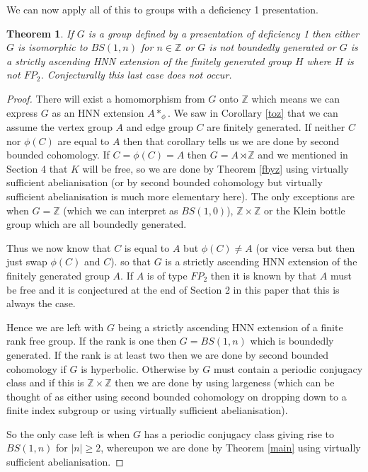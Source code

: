 \documentclass[11pt,reqno]{amsart}
\numberwithin{equation}{section}
\newcommand{\Z}{\mathbb{Z}}
\newcommand{\geqs}{\geqslant}
\newtheorem{thm}{Theorem}[section]
\theoremstyle{definition}
\theoremstyle{remark}
\begin{document}
We can now apply all of this to groups with a deficiency 1 presentation.
\begin{thm} \label{nbgd1}
  If $G$ is a group defined by a presentation of deficiency 1 then either
  $G$ is isomorphic to $BS(1,n)$ for $n\in\Z$ or
  $G$ is not boundedly generated or $G$ is a strictly ascending HNN extension
  of the finitely generated group $H$ where $H$ is not $FP_2$. Conjecturally
  this last case does not occur.
\end{thm}
\begin{proof}
  There will exist a homomorphism from $G$ onto $\Z$
  which means we can express $G$ as an HNN extension $A*_\phi$.
  We saw in Corollary
  \ref{toz} that we can assume the vertex group $A$ and edge group
  $C$ are finitely generated. If neither $C$ nor $\phi(C)$ are equal
  to $A$ then that corollary tells us we are done by second bounded
  cohomology. If $C=\phi(C)=A$ then $G=A\rtimes\Z$ and we mentioned in
  Section 4 that $K$ will be free, so we are done by Theorem \ref{fbyz}
  using virtually sufficient abelianisation (or by second bounded
  cohomology but virtually sufficient abelianisation is much more
  elementary here). The only exceptions are when $G=\Z$ (which we can
  interpret as $BS(1,0)$), $\Z\times\Z$ or the Klein bottle group
  which are all boundedly generated.

  
  Thus we now know that $C$ is equal to $A$ but $\phi(C)\neq A$ (or
  vice versa but then just swap $\phi(C)$ and $C$).
  so that $G$ is a strictly ascending HNN extension of the finitely
  generated group $A$. If $A$ is of type $FP_2$ then it is known by
  \cite{bi} that $A$ must be free and it is conjectured at the
  end of Section 2 in this paper that this is always the case.

  Hence we are left with $G$ being a strictly ascending HNN extension
  of a finite rank free group. If the rank is
  one then $G=BS(1,n)$ which
  is boundedly generated. If the rank is at least two then
  we are done by second bounded cohomology
  if $G$ is hyperbolic. Otherwise by \cite{mut} $G$ must contain a
  periodic conjugacy class and if this is $\Z\times\Z$ then we are
  done by \cite{med1} using largeness (which can be thought of as
  either using second bounded cohomology on dropping down to a finite
  index subgroup or using virtually sufficient abelianisation).

  So the only case left is when $G$ has a periodic conjugacy class
  giving rise to $BS(1,n)$ for $|n|\geqs 2$, whereupon we are done by 
  Theorem \ref{main} using virtually sufficient abelianisation.
\end{proof}
\end{document}
